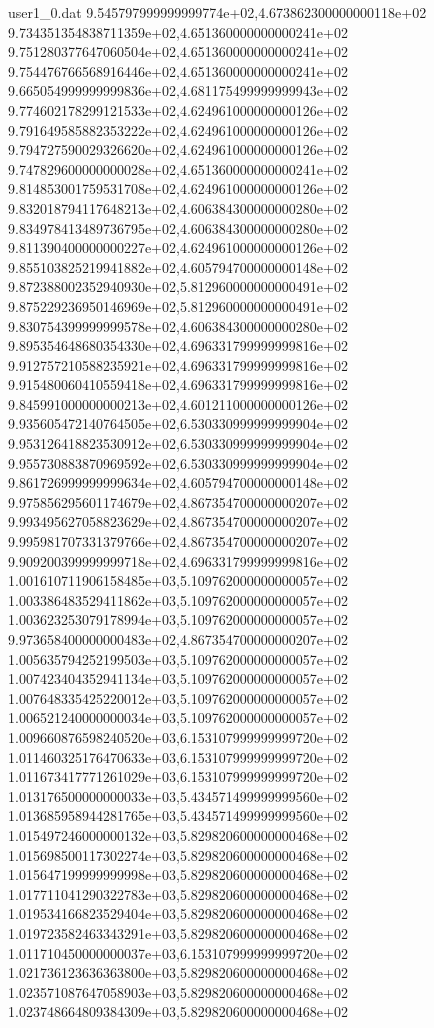 \begin{filecontents}{user1_0.dat}
9.545797999999999774e+02,4.673862300000000118e+02
9.734351354838711359e+02,4.651360000000000241e+02
9.751280377647060504e+02,4.651360000000000241e+02
9.754476766568916446e+02,4.651360000000000241e+02
9.665054999999999836e+02,4.681175499999999943e+02
9.774602178299121533e+02,4.624961000000000126e+02
9.791649585882353222e+02,4.624961000000000126e+02
9.794727590029326620e+02,4.624961000000000126e+02
9.747829600000000028e+02,4.651360000000000241e+02
9.814853001759531708e+02,4.624961000000000126e+02
9.832018794117648213e+02,4.606384300000000280e+02
9.834978413489736795e+02,4.606384300000000280e+02
9.811390400000000227e+02,4.624961000000000126e+02
9.855103825219941882e+02,4.605794700000000148e+02
9.872388002352940930e+02,5.812960000000000491e+02
9.875229236950146969e+02,5.812960000000000491e+02
9.830754399999999578e+02,4.606384300000000280e+02
9.895354648680354330e+02,4.696331799999999816e+02
9.912757210588235921e+02,4.696331799999999816e+02
9.915480060410559418e+02,4.696331799999999816e+02
9.845991000000000213e+02,4.601211000000000126e+02
9.935605472140764505e+02,6.530330999999999904e+02
9.953126418823530912e+02,6.530330999999999904e+02
9.955730883870969592e+02,6.530330999999999904e+02
9.861726999999999634e+02,4.605794700000000148e+02
9.975856295601174679e+02,4.867354700000000207e+02
9.993495627058823629e+02,4.867354700000000207e+02
9.995981707331379766e+02,4.867354700000000207e+02
9.909200399999999718e+02,4.696331799999999816e+02
1.001610711906158485e+03,5.109762000000000057e+02
1.003386483529411862e+03,5.109762000000000057e+02
1.003623253079178994e+03,5.109762000000000057e+02
9.973658400000000483e+02,4.867354700000000207e+02
1.005635794252199503e+03,5.109762000000000057e+02
1.007423404352941134e+03,5.109762000000000057e+02
1.007648335425220012e+03,5.109762000000000057e+02
1.006521240000000034e+03,5.109762000000000057e+02
1.009660876598240520e+03,6.153107999999999720e+02
1.011460325176470633e+03,6.153107999999999720e+02
1.011673417771261029e+03,6.153107999999999720e+02
1.013176500000000033e+03,5.434571499999999560e+02
1.013685958944281765e+03,5.434571499999999560e+02
1.015497246000000132e+03,5.829820600000000468e+02
1.015698500117302274e+03,5.829820600000000468e+02
1.015647199999999998e+03,5.829820600000000468e+02
1.017711041290322783e+03,5.829820600000000468e+02
1.019534166823529404e+03,5.829820600000000468e+02
1.019723582463343291e+03,5.829820600000000468e+02
1.011710450000000037e+03,6.153107999999999720e+02
1.021736123636363800e+03,5.829820600000000468e+02
1.023571087647058903e+03,5.829820600000000468e+02
1.023748664809384309e+03,5.829820600000000468e+02

\end{filecontents}
